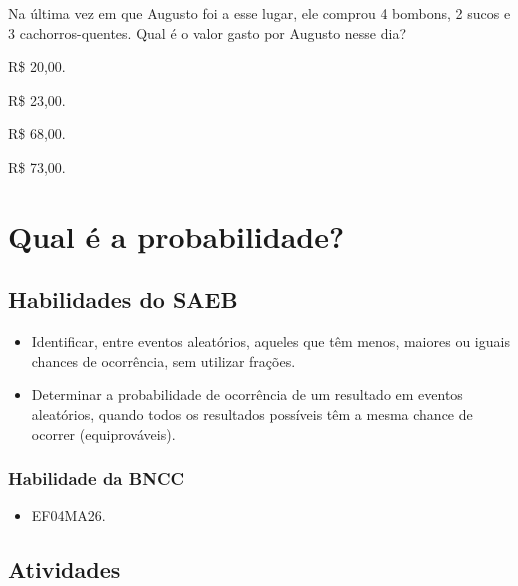 Na última vez em que Augusto foi a esse lugar, ele comprou 4 bombons, 2
sucos e 3 cachorros-quentes. Qual é o valor gasto por Augusto nesse dia?

\begin{escolha}
\item
  R\$ 20,00.
\item
  R\$ 23,00.
\item
  R\$ 68,00.
\item
  R\$ 73,00.
\end{escolha}


\chapter{Qual é a probabilidade?}

\section{Habilidades do SAEB}

\begin{itemize}
\item Identificar, entre eventos aleatórios, aqueles que têm menos, maiores ou
iguais chances de ocorrência, sem utilizar frações.

\item Determinar a probabilidade de ocorrência de um resultado em eventos
aleatórios, quando todos os resultados possíveis têm a mesma chance de
ocorrer (equiprováveis).
\end{itemize}

\subsection{Habilidade da BNCC}

\begin{itemize}
\item EF04MA26.
\end{itemize}


\pagebreak
\section{Atividades}


